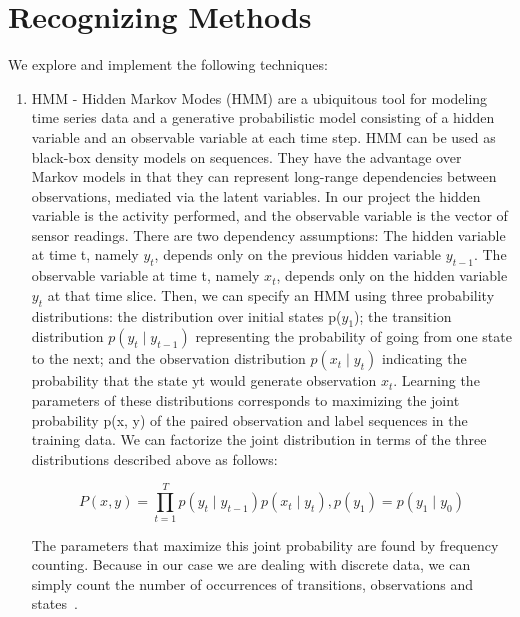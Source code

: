 \documentclass[11pt, oneside]{article}   	%
\begin{document}
\section{Recognizing Methods}
We explore and implement the following techniques:
\begin{enumerate}
\item HMM - 
Hidden Markov Modes (HMM) are a ubiquitous tool for modeling time series data and a generative probabilistic model consisting of a hidden variable and an observable variable at each time step. HMM can be used as black-box density models on sequences. They have the advantage over Markov models in that they can represent long-range dependencies between observations, mediated via the latent variables. 
In our project the hidden variable is the activity performed, and the observable variable is the vector of sensor readings. There are two dependency assumptions: The hidden variable at time t, namely $y_{t}$, depends only on the previous hidden variable $y_{t-1}$. The observable variable at time t, namely $x_{t}$, depends only on the hidden variable $y_{t}$ at that time slice. Then, we can specify an HMM using three probability distributions: the distribution over initial states p($y_{1}$); the transition distribution $p(y_{t}\mid y_{t-1})$ representing the probability of going from one state to the next; and the observation distribution $p(x_{t}\mid y_{t})$ indicating the probability that the state yt would generate observation $x_{t}$.
Learning the parameters of these distributions corresponds to maximizing the joint probability p(x, y) of the paired observation and label sequences in the training data. We can factorize the joint distribution in terms of the three distributions described above as follows:

\begin{equation}
P(x,y)=\prod_{t=1}^{T}p(y_{t}\mid y_{t-1})p(x_{t}\mid y_{t}), p(y_{1}) = p(y_{1}\mid y_{0})
\end{equation}

The parameters that maximize this joint probability are found by frequency counting. Because in our case we are dealing with discrete data, we can simply count the number of occurrences of transitions, observations and states~\cite{emtapia}.


\end{enumerate}
\end{document}
